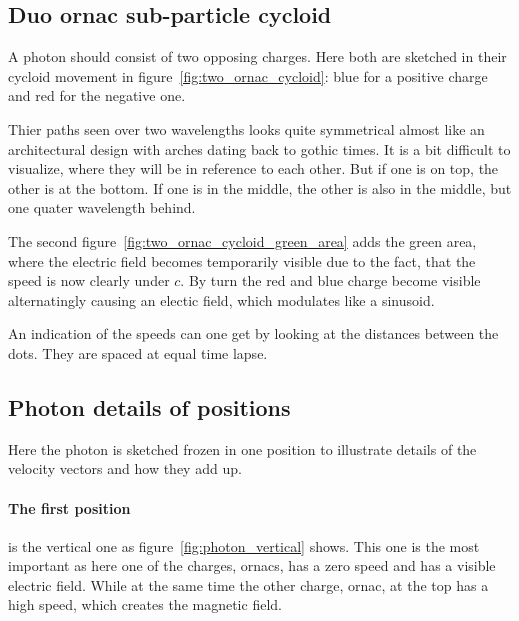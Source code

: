 \subsection{Duo ornac sub-particle cycloid}


A photon should consist of two opposing charges. Here both are sketched in their cycloid movement in figure~\vref{fig:two_ornac_cycloid}: blue for a positive charge and red for the negative one.

Thier paths seen over two wavelengths looks quite symmetrical almost like an architectural design with arches dating back to gothic times. It is a bit difficult to visualize, where they will be in reference to each other. But if one is on top, the other is at the bottom. If one is in the middle, the other is also in the middle, but one quater wavelength behind.

The second figure~\vref{fig:two_ornac_cycloid_green_area} adds the green area, where the electric field becomes temporarily visible due to the fact, that the speed is now clearly under $c$. By turn the red and blue charge become visible alternatingly causing an electic field, which modulates like a sinusoid.

An indication of the speeds can one get by looking at the distances between the dots. They are spaced at equal time lapse.







\subsection{Photon details of positions}
Here the photon is sketched frozen in one position to illustrate details of the velocity vectors and how they add up.


\paragraph{
The first position} is the vertical one as figure~\vref{fig:photon_vertical} shows. This one is the most important as here one of the charges, ornacs, has a zero speed and has a visible electric field. While at the same time the other charge, ornac, at the top has a high speed, which creates the magnetic field.



